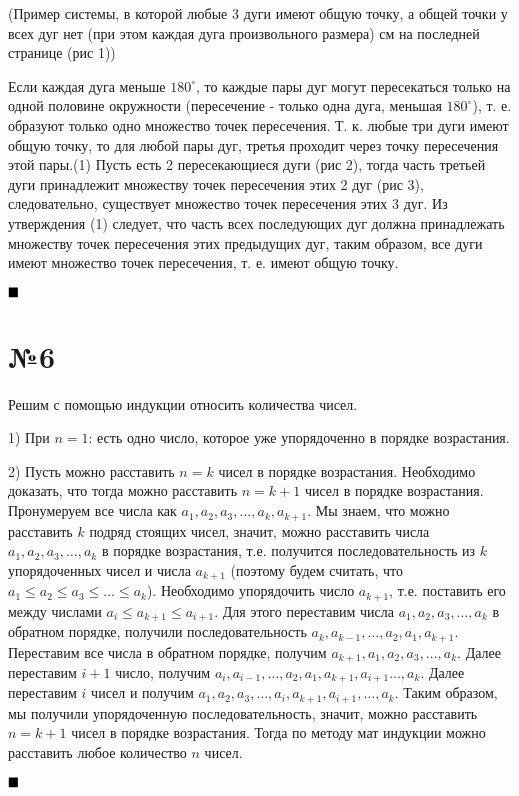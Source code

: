 \documentclass[a4paper, 16pt]{article}
\newenvironment{proof}[1][Доказательство]{%
	\begin{trivlist}
		\item[\hskip \labelsep {\bfseries #1:}]
		\item \hspace{15pt}
	}{
		$ \hfill\blacksquare $
	\end{trivlist}
	\hfill\break
}
\begin{document}
	\begin{proof}
	(Пример системы, в которой любые 3 дуги имеют общую точку, а общей точки у всех дуг нет (при этом каждая дуга произвольного размера) см на последней странице (рис 1))

	Если каждая дуга меньше $180^{\circ}$, то каждые пары дуг могут пересекаться только на одной половине окружности (пересечение - только одна дуга, меньшая $180^{\circ}$), т. е. образуют только одно множество точек пересечения. Т. к. любые три дуги имеют общую точку, то для любой пары дуг, третья проходит через точку пересечения этой пары.(1) Пусть есть 2 пересекающиеся дуги (рис 2), тогда часть третьей дуги принадлежит множеству точек пересечения этих 2 дуг (рис 3), следовательно, существует множество точек пересечения этих 3 дуг. Из утверждения (1) следует, что часть всех последующих дуг должна принадлежать множеству точек пересечения этих предыдущих дуг, таким образом, все дуги имеют множество точек пересечения, т. е. имеют общую точку.
	\end{proof}
	
\section*{№6}

	\begin{proof}
		Решим с помощью индукции относить количества чисел. 
		
		1) При $n=1$: есть одно число, которое уже упорядоченно в порядке возрастания.
		
		2) Пусть можно расставить $n=k$ чисел в порядке возрастания.
		Необходимо доказать, что тогда можно расставить $n = k+1$ чисел в порядке возрастания. Пронумеруем все числа как $a_1, a_2, a_3, \dots, a_k, a_{k+1}.$ Мы знаем, что можно расставить $k$ подряд стоящих чисел, значит, можно расставить числа  $a_1, a_2, a_3, \dots, a_k$ в порядке возрастания, т.е. получится последовательность из $k$ упорядоченных чисел и числа $a_{k+1}$ (поэтому будем считать, что $a_1 \leq a_2 \leq a_3 \leq \dots \leq a_k$). Необходимо упорядочить число $a_{k+1}$, т.е. поставить его между числами $a_i \leq a_{k+1} \leq a_{i+1}$. Для этого переставим числа $a_1, a_2, a_3, \dots, a_k$ в обратном порядке, получили последовательность 
		$a_k, a_{k-1}, \dots, a_2, a_1, a_{k+1}$. Переставим все числа в обратном порядке, получим $a_{k+1}, a_1, a_2, a_3, \dots, a_k$. Далее переставим $i+1$ число, получим
		$a_i, a_{i-1}, \dots, a_2, a_1, a_{k+1}, a_{i + 1} \dots, a_k$. Далее переставим $i$ чисел и получим $a_1, a_2, a_3, \dots, a_i, a_{k+1}, a_{i+1}, \dots, a_k.$ Таким образом, мы получили упорядоченную последовательность, значит, можно расставить $n = k+1$ чисел в порядке возрастания. Тогда по методу мат индукции можно расставить любое количество $n$ чисел.
	\end{proof}
	
\end{document}
